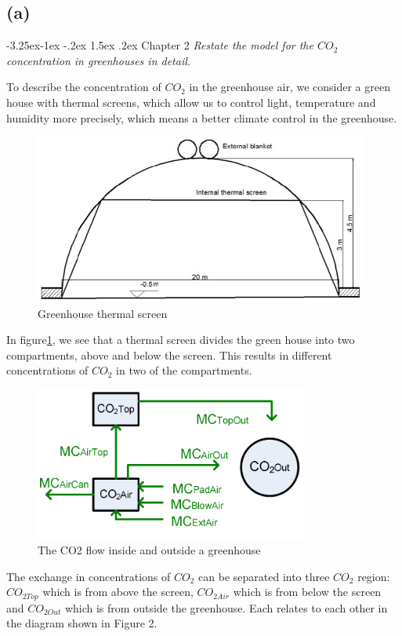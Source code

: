 \documentclass[a4paper]{article}
\makeatletter
\newcounter{subsubsubsection}[subsubsection]
\newcommand\subsubsubsection{\@startsection{subsubsubsection}{4}{\z@}%
                                     {-3.25ex\@plus-1ex \@minus-.2ex}%
                                     {1.5ex \@plus.2ex}%
                                     {\normalfont\normalsize\bfseries}}
\makeatother
\begin{document}
\subsection{(a)}
\subsubsubsection{Chapter 2}
\textit{Restate the model for the \(CO_2\) concentration in greenhouses in detail.}


To describe the concentration of \(CO_2\) in the greenhouse air, we consider a green house with thermal screens, which allow us to control light, temperature and humidity more precisely, which means a better climate control in the greenhouse.
\begin{figure}[H]
  \centering
  \includegraphics[width=11cm]{thrscr.png}
  \caption{Greenhouse thermal screen}\label{fig:thrscr}
\end{figure}

In figure{}\ref{fig:thrscr}, we see that a thermal screen divides the green house into two compartments, above and below the screen.
This results in different concentrations of \(CO_2\) in two of the compartments.

\begin{figure}[H]
  \centering
  \includegraphics[width=9cm]{CO2}
  \caption{The CO2 flow inside and outside a greenhouse}\label{fig:CO2}
\end{figure}

The exchange in concentrations of \(CO_2\) can be separated into three \(CO_2\) region: \(CO_{2Top}\) which is from above the screen, \(CO_{2Air}\) which is from below the screen and \(CO_{2Out}\) which is from outside the greenhouse.
Each relates to each other in the diagram shown in Figure 2.
\end{document}
